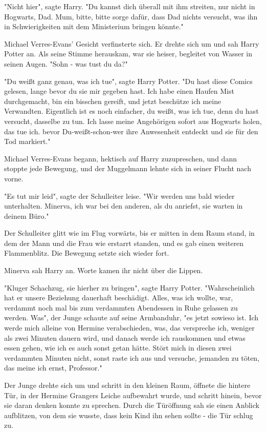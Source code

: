 {"Nicht hier", sagte Harry. "Du kannst dich überall mit ihm streiten, nur nicht in Hogwarts, Dad. Mum, bitte, bitte sorge dafür, dass Dad nichts versucht, was ihn in Schwierigkeiten mit dem Ministerium bringen könnte."

Michael Verres-Evans' Gesicht verfinsterte sich. Er drehte sich um und sah Harry Potter an. Als seine Stimme herauskam, war sie heiser, begleitet von Wasser in seinen Augen. "Sohn - was tust du da?"

"Du weißt ganz genau, was ich tue", sagte Harry Potter. "Du hast diese Comics gelesen, lange bevor du sie mir gegeben hast. Ich habe einen Haufen Mist durchgemacht, bin ein bisschen gereift, und jetzt beschütze ich meine Verwandten. Eigentlich ist es noch einfacher, du weißt, was ich tue, denn du hast versucht, dasselbe zu tun. Ich lasse meine Angehörigen sofort aus Hogwarts holen, das tue ich. bevor Du-weißt-schon-wer ihre Anwesenheit entdeckt und sie für den Tod markiert."

Michael Verres-Evans begann, hektisch auf Harry zuzupreschen, und dann stoppte jede Bewegung, und der Muggelmann lehnte sich in seiner Flucht nach vorne.

"Es tut mir leid", sagte der Schulleiter leise. "Wir werden uns bald wieder unterhalten. Minerva, ich war bei den anderen, als du anriefst, sie warten in deinem Büro."

Der Schulleiter glitt wie im Flug vorwärts, bis er mitten in dem Raum stand, in dem der Mann und die Frau wie erstarrt standen, und es gab einen weiteren Flammenblitz. Die Bewegung setzte sich wieder fort.

Minerva sah Harry an. Worte kamen ihr nicht über die Lippen.

"Kluger Schachzug, sie hierher zu bringen", sagte Harry Potter. "Wahrscheinlich hat er unsere Beziehung dauerhaft beschädigt. Alles, was ich wollte, war, verdammt noch mal bis zum verdammten Abendessen in Ruhe gelassen zu werden. Was", der Junge schaute auf seine Armbanduhr, "es jetzt sowieso ist. Ich werde mich alleine von Hermine verabschieden, was, das verspreche ich, weniger als zwei Minuten dauern wird, und danach werde ich rauskommen und etwas essen gehen, wie ich es auch sonst getan hätte. Stört mich in diesen zwei verdammten Minuten nicht, sonst raste ich aus und versuche, jemanden zu töten, das meine ich ernst, Professor."

Der Junge drehte sich um und schritt in den kleinen Raum, öffnete die hintere Tür, in der Hermine Grangers Leiche aufbewahrt wurde, und schritt hinein, bevor sie daran denken konnte zu sprechen. Durch die Türöffnung sah sie einen Anblick aufblitzen, von dem sie wusste, dass kein Kind ihn sehen sollte - die Tür schlug zu.

}
